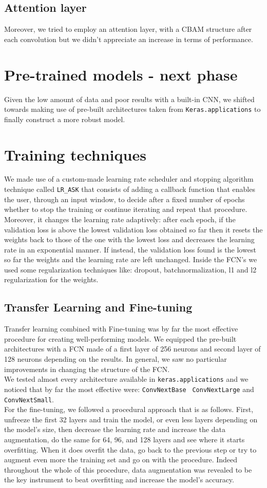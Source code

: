 \documentclass[conference,compsoc,11pt]{IEEEtran}
\begin{document}
\subsection{Attention layer}
Moreover, we tried to employ an attention layer, with a CBAM structure after each convolution but we didn't appreciate an increase in terms of performance.
\section{Pre-trained models - next phase}\label{sec:features-extractor}
Given the low amount of data and poor results with a built-in CNN, we shifted towards making use of pre-built architectures taken from  \verb|Keras.applications| to finally construct a more robust model. 
\section{Training techniques}
We made use of a custom-made learning rate scheduler and stopping algorithm technique called \verb|LR_ASK| that consists of adding a callback function that enables the user, through an input window,  to decide after a fixed number of epochs whether to  stop the training or continue iterating and repeat that procedure. Moreover,  it changes  the learning rate adaptively: after each epoch, if the validation loss is above the lowest validation loss obtained so far then it resets the weights back to those of the one with the lowest loss and decreases the learning rate in an exponential manner. If instead, the validation loss found is the lowest so far the weights and the learning rate are left unchanged. 
Inside the FCN's we used some regularization techniques like: dropout, batchnormalization, l1 and l2 regularization for the weights. 

\subsection{Transfer Learning and Fine-tuning}
Transfer learning combined with Fine-tuning was by far the most effective procedure for creating well-performing models. We equipped the pre-built architectures with a FCN made of a first layer of 256 neurons and second layer of  128 neurons depending on the results. In general, we saw no particular improvements in changing the structure of the FCN. \\
We tested almost every architecture available in \verb|keras.applications| and we noticed that by far the most effective were: \verb|ConvNextBase| \
\verb|ConvNextLarge| and \verb|ConvNextSmall|. \\
For the fine-tuning, we followed a procedural approach that is as follows. First, unfreeze the first 32 layers and train the model, or even less layers depending on the model's size, then decrease the learning rate and increase the data augmentation, do the same for 64, 96, and 128 layers and see where it starts overfitting. When it does overfit the data, go back to the previous step or try to augment even more the training set and go on with the procedure.
Indeed throughout the whole of this procedure, data augmentation was revealed to be the key instrument to beat overfitting and increase the model's accuracy. 
\end{document}
